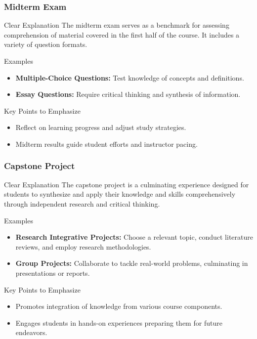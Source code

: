 \documentclass{beamer}
\begin{document}
\begin{frame}[fragile]
    \frametitle{Midterm Exam}
    \begin{block}{Clear Explanation}
        The midterm exam serves as a benchmark for assessing comprehension of material covered in the first half of the course. It includes a variety of question formats.
    \end{block}

    \begin{block}{Examples}
        \begin{itemize}
            \item \textbf{Multiple-Choice Questions:} Test knowledge of concepts and definitions.
            \item \textbf{Essay Questions:} Require critical thinking and synthesis of information.
        \end{itemize}
    \end{block}

    \begin{block}{Key Points to Emphasize}
        \begin{itemize}
            \item Reflect on learning progress and adjust study strategies.
            \item Midterm results guide student efforts and instructor pacing.
        \end{itemize}
    \end{block}
\end{frame}

\begin{frame}[fragile]
    \frametitle{Capstone Project}
    \begin{block}{Clear Explanation}
        The capstone project is a culminating experience designed for students to synthesize and apply their knowledge and skills comprehensively through independent research and critical thinking.
    \end{block}

    \begin{block}{Examples}
        \begin{itemize}
            \item \textbf{Research Integrative Projects:} Choose a relevant topic, conduct literature reviews, and employ research methodologies.
            \item \textbf{Group Projects:} Collaborate to tackle real-world problems, culminating in presentations or reports.
        \end{itemize}
    \end{block}

    \begin{block}{Key Points to Emphasize}
        \begin{itemize}
            \item Promotes integration of knowledge from various course components.
            \item Engages students in hands-on experiences preparing them for future endeavors.
        \end{itemize}
    \end{block}
\end{frame}
\end{document}
